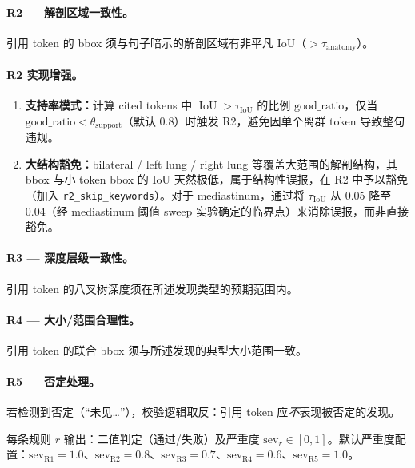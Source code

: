 \documentclass[11pt,a4paper]{article}
\newcommand{\IoU}{\operatorname{IoU}}
\theoremstyle{definition}
\begin{document}
\paragraph{R2 --- 解剖区域一致性。}
引用 token 的 bbox 须与句子暗示的解剖区域有非平凡 IoU（$> \tau_{\mathrm{anatomy}}$）。

\paragraph{R2 实现增强。}
\begin{enumerate}[nosep]
    \item \textbf{支持率模式：}计算 cited tokens 中 $\IoU > \tau_{\mathrm{IoU}}$ 的比例 $\mathrm{good\_ratio}$，仅当 $\mathrm{good\_ratio} < \theta_{\mathrm{support}}$（默认 0.8）时触发 R2，避免因单个离群 token 导致整句违规。
    \item \textbf{大结构豁免：}bilateral / left lung / right lung 等覆盖大范围的解剖结构，其 bbox 与小 token bbox 的 IoU 天然极低，属于结构性误报，在 R2 中予以豁免（加入 \texttt{r2\_skip\_keywords}）。对于 mediastinum，通过将 $\tau_{\mathrm{IoU}}$ 从 0.05 降至 0.04（经 mediastinum 阈值 sweep 实验确定的临界点）来消除误报，而非直接豁免。
\end{enumerate}

\paragraph{R3 --- 深度层级一致性。}
引用 token 的八叉树深度须在所述发现类型的预期范围内。

\paragraph{R4 --- 大小/范围合理性。}
引用 token 的联合 bbox 须与所述发现的典型大小范围一致。

\paragraph{R5 --- 否定处理。}
若检测到否定（``未见\ldots''），校验逻辑取反：引用 token 应\emph{不}表现被否定的发现。

每条规则 $r$ 输出：二值判定（通过/失败）及严重度 $\mathrm{sev}_r \in [0,1]$。默认严重度配置：$\mathrm{sev}_{\mathrm{R1}}=1.0$、$\mathrm{sev}_{\mathrm{R2}}=0.8$、$\mathrm{sev}_{\mathrm{R3}}=0.7$、$\mathrm{sev}_{\mathrm{R4}}=0.6$、$\mathrm{sev}_{\mathrm{R5}}=1.0$。
\end{document}
